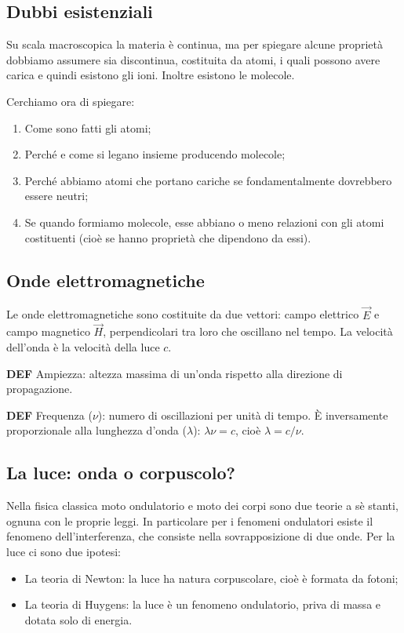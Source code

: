 \subsection{Dubbi esistenziali}
Su scala macroscopica la materia è continua, ma per spiegare alcune proprietà dobbiamo assumere sia discontinua, costituita da atomi, i quali possono avere carica e quindi esistono gli ioni. Inoltre esistono le molecole.

Cerchiamo ora di spiegare:
\begin{enumerate}
    \item Come sono fatti gli atomi;
    \item Perché e come si legano insieme producendo molecole;
    \item Perché abbiamo atomi che portano cariche se fondamentalmente dovrebbero essere neutri;
    \item Se quando formiamo molecole, esse abbiano o meno relazioni con gli atomi costituenti (cioè se hanno proprietà che dipendono da essi).
  \end{enumerate}
  
  \subsection{Onde elettromagnetiche}
Le onde elettromagnetiche sono costituite da due vettori: campo elettrico $\vec{E}$ e campo magnetico $\vec{H}$, perpendicolari tra loro che oscillano nel tempo. La velocità dell'onda è la velocità della luce $c$.

\vspace{0.2cm}\textbf{DEF} Ampiezza: altezza massima di un'onda rispetto alla direzione di propagazione. 

\vspace{0.2cm}\textbf{DEF} Frequenza ($\nu$): numero di oscillazioni per unità di tempo. È inversamente proporzionale alla lunghezza d'onda ($\lambda$): $\lambda\nu=c$, cioè $\lambda=c/\nu$.

\subsection{La luce: onda o corpuscolo?}
Nella fisica classica moto ondulatorio e moto dei corpi sono due teorie a sè stanti, ognuna con le proprie leggi.
In particolare per i fenomeni ondulatori esiste il fenomeno dell'interferenza, che consiste nella sovrapposizione di due onde.
Per la luce ci sono due ipotesi:
\begin{itemize}
  \item  La teoria di Newton: la luce ha natura corpuscolare, cioè è formata da fotoni;
  \item  La teoria di Huygens: la luce è un fenomeno ondulatorio, priva di massa e dotata solo di energia.
\end{itemize}
